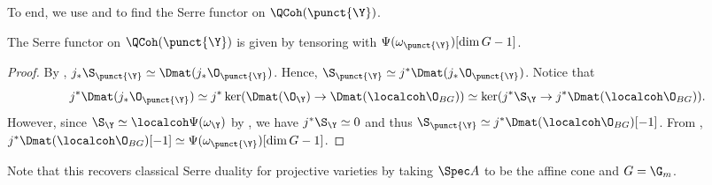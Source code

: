 \documentclass{amsart}
\begin{document}

  To end, we use  and 
  to find the Serre functor on \(\QCoh(\punct{\Y})\).

  \begin{prop}\label{prop:serre_puncture}
    The Serre functor on \(\QCoh(\punct{\Y})\) is given by tensoring with \(\Psi(\omega_{\punct{\Y}})[\dim G - 1]\).
  \end{prop}
  \begin{proof}
    By , \(j_\ast \S_{\punct{\Y}} \simeq \Dmat(j_\ast \O_{\punct{\Y}})\).
    Hence, \(\S_{\punct{\Y}} \simeq j^\ast \Dmat(j_\ast \O_{\punct{\Y}})\). Notice that
    \begin{displaymath}
      j^\ast \Dmat(j_\ast \O_{\punct{\Y}}) \simeq j^\ast\ker(\Dmat(\O_\Y) \to \Dmat(\localcoh \O_{BG}))
      \simeq \ker(j^\ast \S_\Y \to j^\ast \Dmat(\localcoh \O_{BG})).
    \end{displaymath}
    However, since \(\S_\Y \simeq \localcoh \Psi(\omega_\Y)\) by ,
    we have \(j^\ast \S_\Y \simeq 0\) and thus \(\S_{\punct{\Y}} \simeq j^\ast\Dmat(\localcoh \O_{BG})[-1]\).
    From , \(j^\ast\Dmat(\localcoh \O_{BG})[-1] \simeq \Psi(\omega_{\punct{\Y}})[\dim G -1]\).
  \end{proof}

  \begin{rmk}
    Note that this recovers classical Serre duality for projective varieties by taking \(\Spec A\)
    to be the affine cone and \(G = \G_m\).
  \end{rmk}



  
  
  
\end{document}
